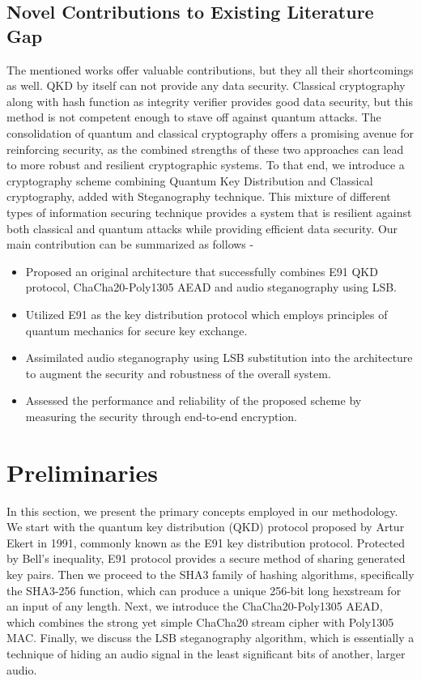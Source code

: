 \documentclass[a4paper]{cas-sc}
\begin{document}
\subsection{Novel Contributions to Existing Literature Gap}
The mentioned works offer valuable contributions, but they all their shortcomings as well. QKD by itself can not provide any data security. Classical cryptography along with hash function as integrity verifier provides good data security, but this method is not competent enough to stave off against quantum attacks. The consolidation of quantum and classical cryptography offers a promising avenue for reinforcing security, as the combined strengths of these two approaches can lead to more robust and resilient cryptographic systems. To that end, we introduce a cryptography scheme combining Quantum Key Distribution and Classical cryptography, added with Steganography technique. This mixture of different types of information securing technique provides a system that is resilient against both classical and quantum attacks while providing efficient data security. Our main contribution can be summarized as follows -
\begin{itemize}
    \item Proposed an original architecture that successfully combines E91 QKD protocol, ChaCha20-Poly1305 AEAD and audio steganography using LSB.
    \item Utilized E91 as the key distribution protocol which employs principles of quantum mechanics for secure key exchange.
    \item Assimilated audio steganography using LSB substitution into the architecture to augment the security and robustness of the overall system.
    \item Assessed the performance and reliability of the proposed scheme by measuring the security through end-to-end encryption.
\end{itemize}
\section{Preliminaries}
\label{sec:preliminaries}
In this section, we present the primary concepts employed in our methodology. We start with the quantum key distribution (QKD) protocol proposed by Artur Ekert in 1991, commonly known as the E91 key distribution protocol. Protected by Bell's inequality, E91 protocol provides a secure method of sharing generated key pairs. Then we proceed to the SHA3 family of hashing algorithms, specifically the SHA3-256 function, which can produce a unique 256-bit long hexstream for an input of any length. Next, we introduce the ChaCha20-Poly1305 AEAD, which combines the strong yet simple ChaCha20 stream cipher with Poly1305 MAC. Finally, we discuss the LSB steganography algorithm, which is essentially a technique of hiding an audio signal in the least significant bits of another, larger audio.
\end{document}
